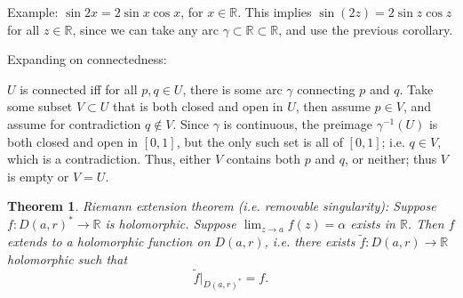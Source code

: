 \documentclass{artikel3}
\newcommand{\alt}[1]{\tilde{#1}}
\newcommand{\reals}{\mathbb{R}}
\newcommand{\complex}{\mathbb{R}}
\newtheorem{thm}{Theorem}
\numberwithin{equation}{enumi}
\begin{document}
Example: $\sin 2x=2\sin x\cos x$, for $x\in\reals$.  This
implies $\sin(2z)=2\sin z\cos z$ for all $z\in\complex$,
since we can take any arc $\gamma\subset \reals\subset \complex$,
and use the previous corollary.

Expanding on connectedness:

$U$ is connected iff for all $p,q\in U$, there is some arc $\gamma$
connecting $p$ and $q$.  Take some subset $V\subset U$
that is both closed and open in $U$, then assume $p\in V$, and
assume for contradiction $q\notin V$.  Since $\gamma$ is continuous,
the preimage $\gamma^{-1}(U)$ is both closed and open in $[0,1]$,
but the only such set is all of $[0,1]$; i.e. $q\in V$,
which is a contradiction.  Thus, either $V$ contains both
$p$ and $q$, or neither; thus $V$ is empty or $V=U$.

\begin{thm}
	Riemann extension theorem (i.e. removable singularity): Suppose
	$f:D(a,r)^*\to\complex$ is holomorphic.  Suppose $\lim_{z\to a}f(z)=\alpha$
	exists in $\complex$.  Then $f$ extends to a holomorphic function on $D(a,r)$,
	i.e. there exists $\alt{f}:D(a,r)\to\complex$ holomorphic such that \[
		\alt{f}|_{D(a,r)^*}=f.
	\]
\end{thm}
\end{document}
